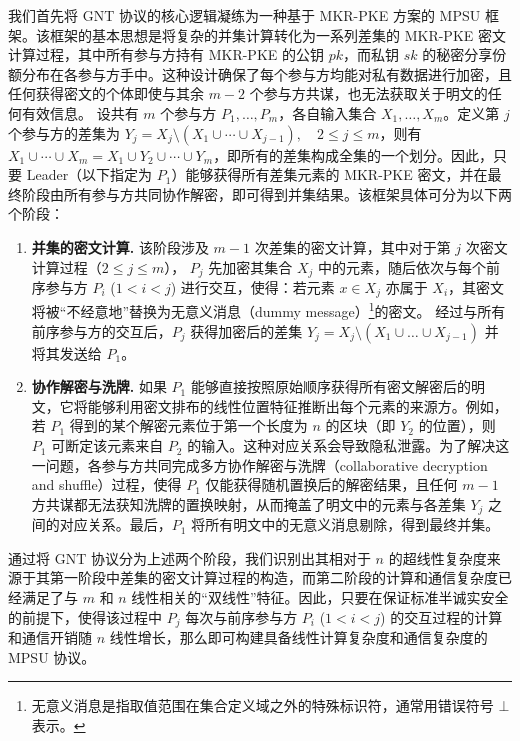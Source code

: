 我们首先将 GNT 协议的核心逻辑凝练为一种基于 MKR-PKE 方案的 MPSU 框架。该框架的基本思想是将复杂的并集计算转化为一系列差集的 MKR-PKE 密文计算过程，其中所有参与方持有 MKR-PKE 的公钥 $pk$，而私钥 $sk$ 的秘密分享份额分布在各参与方手中。这种设计确保了每个参与方均能对私有数据进行加密，且任何获得密文的个体即使与其余 $m-2$ 个参与方共谋，也无法获取关于明文的任何有效信息。
设共有 $m$ 个参与方 $P_1,\dots,P_m$，各自输入集合 $X_1,\dots,X_m$。定义第 $j$ 个参与方的差集为 $Y_j = X_j \setminus (X_1 \cup \cdots \cup X_{j-1}), \quad 2 \le j \le m$，则有 $X_1 \cup \cdots \cup X_m = X_1 \cup Y_2 \cup \cdots \cup Y_m$，即所有的差集构成全集的一个划分。因此，只要 Leader（以下指定为 $P_1$）能够获得所有差集元素的 MKR-PKE 密文，并在最终阶段由所有参与方共同协作解密，即可得到并集结果。该框架具体可分为以下两个阶段：

\begin{enumerate}
    \item \textbf{并集的密文计算.} 该阶段涉及 $m-1$ 次差集的密文计算，其中对于第 $j$ 次密文计算过程（$2 \le j \le m$）， $P_j$ 先加密其集合 $X_j$ 中的元素，随后依次与每个前序参与方 $P_i$ ($1 < i < j$) 进行交互，使得：若元素 $x \in X_j$ 亦属于 $X_i$，其密文将被“不经意地”替换为无意义消息（dummy message）\footnote{无意义消息是指取值范围在集合定义域之外的特殊标识符，通常用错误符号 $\bot$ 表示。}的密文。
    经过与所有前序参与方的交互后，$P_j$ 获得加密后的差集 $Y_j = X_j \setminus (X_1 \cup \dots \cup X_{j-1})$ 并将其发送给 $P_1$。
    \item \textbf{协作解密与洗牌.} 如果 $P_1$ 能够直接按照原始顺序获得所有密文解密后的明文，它将能够利用密文排布的线性位置特征推断出每个元素的来源方。例如，若 $P_1$ 得到的某个解密元素位于第一个长度为 $n$ 的区块（即 $Y_2$ 的位置），则 $P_1$ 可断定该元素来自 $P_2$ 的输入。这种对应关系会导致隐私泄露。为了解决这一问题，各参与方共同完成多方协作解密与洗牌（collaborative decryption and shuffle）过程，使得 $P_1$ 仅能获得随机置换后的解密结果，且任何 $m-1$ 方共谋都无法获知洗牌的置换映射，从而掩盖了明文中的元素与各差集 $Y_j$ 之间的对应关系。最后，$P_1$ 将所有明文中的无意义消息剔除，得到最终并集。
\end{enumerate}

 通过将 GNT 协议分为上述两个阶段，我们识别出其相对于 $n$ 的超线性复杂度来源于其第一阶段中差集的密文计算过程的构造，而第二阶段的计算和通信复杂度已经满足了与 $m$ 和 $n$ 线性相关的“双线性”特征。因此，只要在保证标准半诚实安全的前提下，使得该过程中 $P_j$ 每次与前序参与方 $P_i$ ($1 < i < j$) 的交互过程的计算和通信开销随 $n$ 线性增长，那么即可构建具备线性计算复杂度和通信复杂度的 MPSU 协议。

